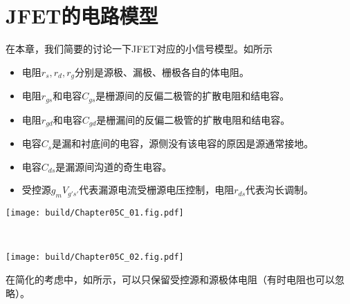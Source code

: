 \section{JFET的电路模型}
在本章，我们简要的讨论一下JFET对应的小信号模型。如所示
\begin{itemize}
    \item 电阻$r_s, r_d, r_g$分别是源极、漏极、栅极各自的体电阻。
    \item 电阻$r_{gs}$和电容$C_{gs}$是栅源间的反偏二极管的扩散电阻和结电容。
    \item 电阻$r_{gd}$和电容$C_{gd}$是栅漏间的反偏二极管的扩散电阻和结电容。
    \item 电容$C_s$是漏和衬底间的电容，源侧没有该电容的原因是源通常接地。
    \item 电容$C_{ds}$是漏源间沟道的奇生电容。
    \item 受控源$g_mV_{g's'}$代表漏源电流受栅源电压控制，电阻$r_{ds}$代表沟长调制。
\end{itemize}


\begin{Figure}[JFET的电路模型]
    \begin{FigureSub}[完整模型]
        \texttt{[image: build/Chapter05C\_01.fig.pdf]}   
    \end{FigureSub}\\ \vspace{0.75cm}
    \begin{FigureSub}[简化模型]
        \texttt{[image: build/Chapter05C\_02.fig.pdf]}
    \end{FigureSub}
\end{Figure}
在简化的考虑中，如所示，可以只保留受控源和源极体电阻（有时电阻也可以忽略）。